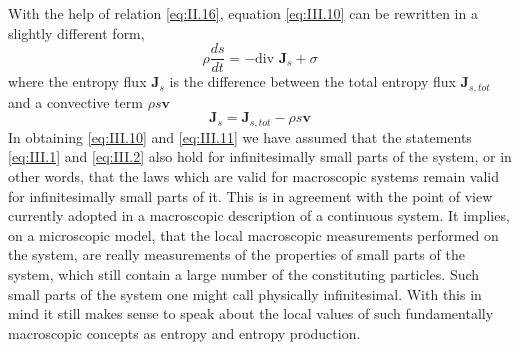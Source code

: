 With the help of relation \eqref{eq:II.16}, equation \eqref{eq:III.10} can be rewritten in a slightly different form,
\begin{equation}
\rho \frac{d s}{d t} = - \textrm{div } \bm{J}_{s} + \sigma
    \label{eq:III.12}
\end{equation}
where the entropy flux $\bm{J}_s$ is the difference between the total entropy flux $\bm{J}_{s,tot}$ and a convective term $\rho s \bm{v}$
\begin{equation}
\bm{J}_{s} = \bm{J}_{s,tot} - \rho s \bm{v}
    \label{eq:III.13}
\end{equation}
In obtaining \eqref{eq:III.10} and \eqref{eq:III.11} we have assumed that the statements \eqref{eq:III.1} and \eqref{eq:III.2} also hold for infinitesimally small parts of the system, or in other words, that the laws which are valid for macroscopic systems remain valid for infinitesimally small parts of it. This is in agreement with the point of view currently adopted in a macroscopic description of a continuous system. It implies, on a microscopic model, that the local macroscopic measurements performed on the system, are really measurements of the properties of small parts of the system, which still contain a large number of the constituting particles. Such small parts of the system one might call physically infinitesimal. With this in mind it still makes sense to speak about the local values of such fundamentally macroscopic concepts as entropy and entropy production.

